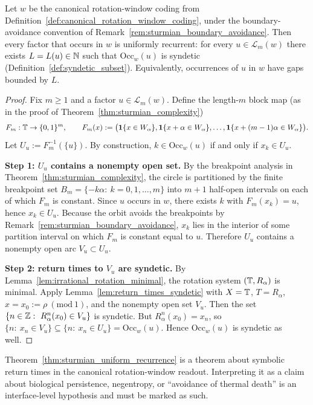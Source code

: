 \begin{theorem}\label{thm:sturmian_uniform_recurrence}
\MathTag Let $w$ be the canonical rotation-window coding from Definition~\ref{def:canonical_rotation_window_coding}, under the boundary-avoidance convention of Remark~\ref{rem:sturmian_boundary_avoidance}.
Then every factor that occurs in $w$ is uniformly recurrent:
for every $u\in\mathcal{L}_m(w)$ there exists $L=L(u)\in\mathbb{N}$ such that $\mathrm{Occ}_w(u)$ is syndetic (Definition~\ref{def:syndetic_subset}).
Equivalently, occurrences of $u$ in $w$ have gaps bounded by $L$.
\end{theorem}

\begin{proof}
Fix $m\ge 1$ and a factor $u\in\mathcal{L}_m(w)$.
Define the length-$m$ block map (as in the proof of Theorem~\ref{thm:sturmian_complexity})
\[
F_m:\mathbb{T}\to\{0,1\}^m,\qquad
F_m(x):=\big(\mathbf{1}\{x\in W_\alpha\},\mathbf{1}\{x+\alpha\in W_\alpha\},\ldots,\mathbf{1}\{x+(m-1)\alpha\in W_\alpha\}\big).
\]
Let $U_u:=F_m^{-1}(\{u\})$.
By construction, $k\in\mathrm{Occ}_w(u)$ if and only if $x_k\in U_u$.

\medskip
\noindent\textbf{Step 1: $U_u$ contains a nonempty open set.}
By the breakpoint analysis in Theorem~\ref{thm:sturmian_complexity}, the circle is partitioned by the finite breakpoint set
$B_m=\{-k\alpha:\ k=0,1,\ldots,m\}$ into $m+1$ half-open intervals on each of which $F_m$ is constant.
Since $u$ occurs in $w$, there exists $k$ with $F_m(x_k)=u$, hence $x_k\in U_u$.
Because the orbit avoids the breakpoints by Remark~\ref{rem:sturmian_boundary_avoidance}, $x_k$ lies in the interior of some partition interval on which $F_m$ is constant equal to $u$.
Therefore $U_u$ contains a nonempty open arc $V_u\subset U_u$.

\medskip
\noindent\textbf{Step 2: return times to $V_u$ are syndetic.}
By Lemma~\ref{lem:irrational_rotation_minimal}, the rotation system $(\mathbb{T},R_\alpha)$ is minimal.
Apply Lemma~\ref{lem:return_times_syndetic} with $X=\mathbb{T}$, $T=R_\alpha$, $x=x_0:=\rho\ (\mathrm{mod}\ 1)$, and the nonempty open set $V_u$.
Then the set $\{n\in\mathbb{Z}:\ R_\alpha^n(x_0)\in V_u\}$ is syndetic.
But $R_\alpha^n(x_0)=x_n$, so $\{n:\ x_n\in V_u\}\subseteq \{n:\ x_n\in U_u\}=\mathrm{Occ}_w(u)$.
Hence $\mathrm{Occ}_w(u)$ is syndetic as well.
\end{proof}

\begin{remark}\label{rem:uniform_recurrence_interpretive_boundary}
\AuditTag Theorem~\ref{thm:sturmian_uniform_recurrence} is a theorem about symbolic return times in the canonical rotation-window readout.
Interpreting it as a claim about biological persistence, negentropy, or ``avoidance of thermal death'' is an interface-level hypothesis and must be marked as such.
\end{remark}


